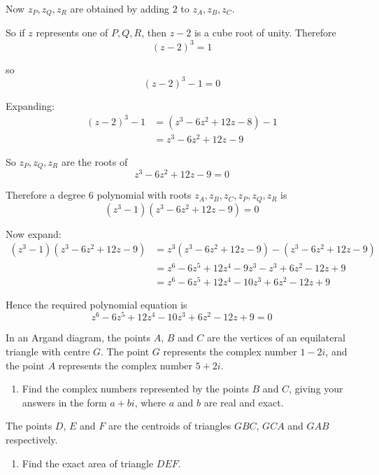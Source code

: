 \documentclass[leqno]{article}
\begin{document}
\begin{enumerate}[
  label=\textbf{\arabic*.},
  leftmargin=*,
  topsep=0pt,
  partopsep=0pt,
  parsep=0pt
]
\begin{djsSolution}
Now \(z_P,z_Q,z_R\) are obtained by adding \(2\) to \(z_A,z_B,z_C\).

So if \(z\) represents one of \(P,Q,R\), then \(z-2\) is a cube root of unity. Therefore
\[
(z-2)^3=1
\]

so
\[
(z-2)^3-1=0
\]

Expanding:
\begin{align*}
(z-2)^3-1&=(z^3-6z^2+12z-8)-1 \\
&=z^3-6z^2+12z-9
\end{align*}

So \(z_P,z_Q,z_R\) are the roots of
\[
z^3-6z^2+12z-9=0
\]

Therefore a degree \(6\) polynomial with roots \(z_A,z_B,z_C,z_P,z_Q,z_R\) is
\[
(z^3-1)(z^3-6z^2+12z-9)=0
\]

Now expand:
\begin{align*}
(z^3-1)(z^3-6z^2+12z-9)
&=z^3(z^3-6z^2+12z-9)-(z^3-6z^2+12z-9) \\
&=z^6-6z^5+12z^4-9z^3-z^3+6z^2-12z+9 \\
&=z^6-6z^5+12z^4-10z^3+6z^2-12z+9
\end{align*}

Hence the required polynomial equation is
\[
z^6-6z^5+12z^4-10z^3+6z^2-12z+9=0
\]
\end{djsSolution}


\newpage

\questionitem

In an Argand diagram, the points $A$, $B$ and $C$ are the vertices of an equilateral triangle with centre $G$. The point $G$ represents the complex number $1-2i$, and the point $A$ represents the complex number $5+2i$. \\
\begin{enumerate}[label=\textbf{(\alph*)}]
  \item Find the complex numbers represented by the points $B$ and $C$, giving your answers in the form $a+bi$, where $a$ and $b$ are real and exact.  \\
\end{enumerate}
The points $D$, $E$ and $F$ are the centroids of triangles $GBC$, $GCA$ and $GAB$ respectively. \\
\begin{enumerate}[label=\textbf{(\alph*)}, resume]
  \item Find the exact area of triangle $DEF$.  \\
\end{enumerate}


\end{enumerate}
\end{document}
